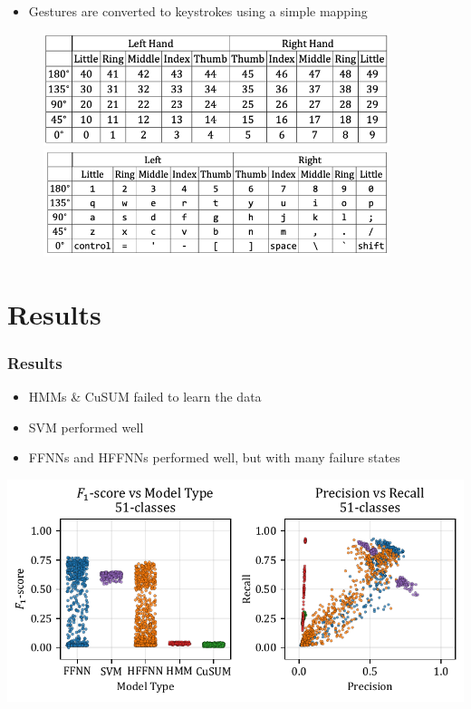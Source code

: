 \documentclass[xcolor={svgnames,table},10pt,fleqn]{beamer}
\begin{document}
\begin{frame}
    \begin{itemize}
        \item Gestures are converted to keystrokes using a simple mapping
    \end{itemize}
    \begin{figure}[h]
        \centering
        \includegraphics[width=0.9\textwidth]{mapping_idxs.png}
        \includegraphics[width=0.9\textwidth]{mapping_qwerty.png}
    \end{figure}
\end{frame}


\section{Results}
\begin{frame}
    \frametitle{Results}
    \begin{itemize}
        \item HMMs \& CuSUM failed to learn the data
        \item SVM performed well
        \item FFNNs and HFFNNs performed well, but with many failure states
    \end{itemize}
    \includegraphics[width=\textwidth]{05_precision_recall_51_classes.pdf}
\end{frame}
\end{document}
